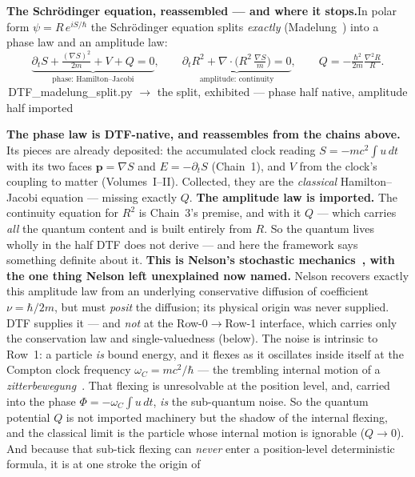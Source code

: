 \documentclass[11pt]{article}
\newcommand{\pychip}[2]{{\footnotesize\colorbox{cbPyBg}{\ttfamily\,#1\,}\,{\color{gray}$\to$ #2}}}
\begin{document}
\begin{tcolorbox}[keybox]
\textbf{The Schr\"odinger equation, reassembled --- and where it stops.}\enspace In polar form
$\psi=R\,e^{iS/\hbar}$ the Schr\"odinger equation splits \emph{exactly} (Madelung~\cite{Madelung1927}) into
a phase law and an amplitude law:
\[
  \underbrace{\partial_t S+\tfrac{(\nabla S)^2}{2m}+V+Q=0}_{\text{phase: Hamilton--Jacobi}},
  \qquad
  \underbrace{\partial_t R^2+\nabla\!\cdot\!\Big(R^2\,\tfrac{\nabla S}{m}\Big)=0}_{\text{amplitude: continuity}},
  \qquad Q=-\tfrac{\hbar^2}{2m}\tfrac{\nabla^2 R}{R}.
\]
\pychip{DTF\_madelung\_split.py}{the split, exhibited --- phase half native, amplitude half imported}
\par\smallskip
\textbf{The phase law is DTF-native, and reassembles from the chains above.} Its pieces are already
deposited: the accumulated clock reading $S=-mc^2\!\int u\,dt$ with its two faces $\mathbf p=\nabla S$ and
$E=-\partial_t S$ (Chain~1), and $V$ from the clock's coupling to matter (Volumes~I--II). Collected, they
are the \emph{classical} Hamilton--Jacobi equation --- missing exactly $Q$.
\textbf{The amplitude law is imported.} The continuity equation for $R^2$ is Chain~3's premise, and with it
$Q$ --- which carries \emph{all} the quantum content and is built entirely from $R$. So the quantum lives
wholly in the half DTF does not derive --- and here the framework says something definite about it.
\textbf{This is Nelson's stochastic mechanics~\cite{Nelson1966}, with the one thing Nelson left unexplained
now named.} Nelson recovers exactly this amplitude law from an underlying conservative diffusion of
coefficient $\nu=\hbar/2m$, but must \emph{posit} the diffusion; its physical origin was never supplied.
DTF supplies it --- and \emph{not} at the Row-0$\to$Row-1 interface, which carries only the conservation law
and single-valuedness (below). The noise is intrinsic to Row~1: a particle \emph{is} bound energy, and it
flexes as it oscillates inside itself at the Compton clock frequency $\omega_C=mc^2/\hbar$ --- the trembling
internal motion of a \emph{zitterbewegung}~\cite{Schrodinger1930,Hestenes1990}. That flexing is unresolvable
at the position level, and, carried into the phase $\Phi=-\omega_C\!\int u\,dt$, \emph{is} the sub-quantum
noise. So the quantum potential $Q$ is not imported machinery but the shadow of the internal flexing, and
the classical limit is the particle whose internal motion is ignorable ($Q\to0$). And because that sub-tick
flexing can \emph{never} enter a position-level deterministic formula, it is at one stroke the origin of

\end{tcolorbox}
\end{document}

